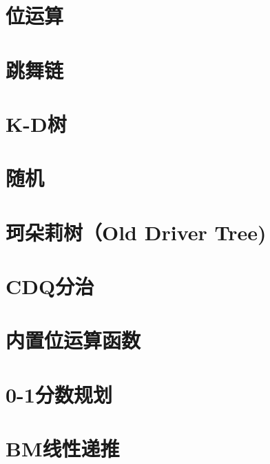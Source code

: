 \section{位运算}
\raggedbottom
\hrulefill
\section{跳舞链}
\raggedbottom
\hrulefill
\section{K-D树}
\raggedbottom
\hrulefill
\section{随机}
\raggedbottom
\hrulefill
\section{珂朵莉树（Old Driver Tree)}
\raggedbottom
\hrulefill
\section{CDQ分治}
\raggedbottom
\hrulefill
\section{内置位运算函数}
\raggedbottom
\hrulefill
\section{0-1分数规划}
\raggedbottom
\hrulefill
\section{BM线性递推}
\raggedbottom
\hrulefill


